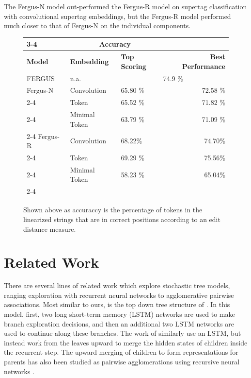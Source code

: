 \documentclass[11pt]{article}
\begin{document}
The Fergus-N model out-performed the Fergus-R model on supertag classification with convolutional supertag embeddings, but the Fergus-R model performed much closer to that of Fergus-N on the individual components. 



\begin{figure}
\centering
\begin{tabular}{|l|p{3cm}|p{2.5cm}|r|}
\cline{3-4}
\multicolumn{2}{}{} & \multicolumn{2}{|c|}{Accuracy}   \\ \hline
\textbf{Model} & \textbf{Embedding}  & \textbf{Top Scoring} & \textbf{Best Performance} \\ \hline
FERGUS & n.a. & \multicolumn{2}{|c|}{74.9  \%} \\
\hline \hline
Fergus-N & Convolution & 65.80 \% & 72.58 \% \\ \cline{2-4}
         & Token       & 65.52 \%  & 71.82 \% \\ \cline{2-4}
         & Minimal Token & 63.79 \% & 71.09 \% \\ \cline{2-4}
\hline
Fergus-R & Convolution & 68.22\% & 74.70\% \\ \cline{2-4}
         & Token       &  69.29 \% & 75.56\% \\ \cline{2-4}
         & Minimal Token &  58.23 \% & 65.04\% \\ \cline{2-4}
\hline
\end{tabular}
\label{table:linresults}
\caption{Shown above as accuraccy is the percentage of tokens in the linearized strings that are in correct positions according to an edit distance measure.}
\end{figure}

\section{Related Work}
\label{sec:relatedwork}

There are several lines of related work which explore stochastic tree models, ranging exploration with recurrent neural networks to agglomerative pairwise associations. 
%
Most similar to ours, is the top down tree structure of .
%
In this model, first, two long short-term memory (LSTM) networks are used to make branch exploration decisions, and then an additional two LSTM networks are used to continue along these branches. 
%
The work of  similarly use an LSTM, but instead work from the leaves upward to merge the hidden states of children inside the recurrent step. 
%
The upward merging of children to form representations for parents has also been studied as pairwise agglomerations using recursive neural networks \cite{Socher2010}.
\end{document}

